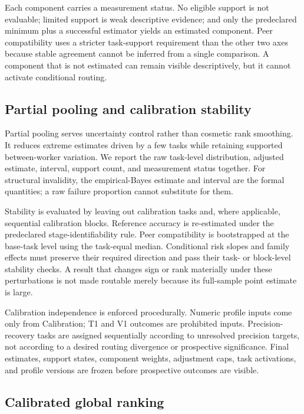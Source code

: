Each component carries a measurement status. No eligible support is not evaluable; limited support is weak descriptive evidence; and only the predeclared minimum plus a successful estimator yields an estimated component. Peer compatibility uses a stricter task-support requirement than the other two axes because stable agreement cannot be inferred from a single comparison. A component that is not estimated can remain visible descriptively, but it cannot activate conditional routing.

\subsection{Partial pooling and calibration stability}

Partial pooling serves uncertainty control rather than cosmetic rank smoothing. It reduces extreme estimates driven by a few tasks while retaining supported between-worker variation. We report the raw task-level distribution, adjusted estimate, interval, support count, and measurement status together. For structural invalidity, the empirical-Bayes estimate and interval are the formal quantities; a raw failure proportion cannot substitute for them.

Stability is evaluated by leaving out calibration tasks and, where applicable, sequential calibration blocks. Reference accuracy is re-estimated under the predeclared stage-identifiability rule. Peer compatibility is bootstrapped at the base-task level using the task-equal median. Conditional risk slopes and family effects must preserve their required direction and pass their task- or block-level stability checks. A result that changes sign or rank materially under these perturbations is not made routable merely because its full-sample point estimate is large.

Calibration independence is enforced procedurally. Numeric profile inputs come only from Calibration; T1 and V1 outcomes are prohibited inputs. Precision-recovery tasks are assigned sequentially according to unresolved precision targets, not according to a desired routing divergence or prospective significance. Final estimates, support states, component weights, adjustment caps, task activations, and profile versions are frozen before prospective outcomes are visible.

\subsection{Calibrated global ranking}

